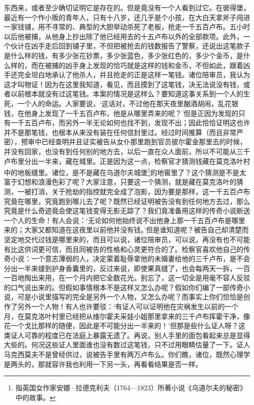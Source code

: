 东西来，或者至少确切证明它是存在的。但是竟没有一个人看到过它。在彼得堡，最近有一个作小贩的青年人，只有十八岁，还几乎是个小孩，在大白天拿斧子闯进一家钱铺，用不寻常的、典型的大胆举动杀死了老板，抢走一千五百卢布。五小时以后他被捕，从他身上抄出除了他已经用去的十五卢布以外的全部款项。此外，一个伙计在凶手走后回到铺子里，不但把被抢去的钱数报告了警察，还说出这笔款子是什么样的钱，有多少张花钞票，多少张蓝色，多少张红色的，多少个金币，是什么样的，而在被捕的凶手身上发现的恰巧就是这样的钱和金币，不但如此，跟着凶手还完全坦白地承认了他杀人，并且抢走的正是这样一笔钱。诸位陪审员，我认为这才叫物证！因为在这里我知道，看见，而且摸到了这笔钱，决无法说没有钱，或者以前根本就没有过这笔钱。本案的情况是这样么？要知道这事关系到一个人的生死，一个人的命运。人家要说，‘这话对，不过他在那天夜里酗酒胡闹，乱花银钱，在他身上发现了一千五百卢布，他是从哪里弄来的呢？’但是正因为发现的只有一千五百卢布，而另外一半无论如何也找不到，发现不出；因此恰恰证明这也许并不是那笔钱，也根本从来没有装在任何信封里过。经过时间推算（而且非常严密），预审中已经查明并且证实被告从女仆那里跑到官员彼尔霍金那里去的时候，并没有回家，也没有到任何别的地方去，以后一直在众人面前，所以不可能从三千卢布里分出一半来，藏在城里。正是因为这一点，检察官才猜测钱藏在莫克洛叶村中的地板缝里。诸位，是不是藏在乌道尔夫城堡\footnote{指英国女作家安娜·拉德克利夫（1764—1823）所著小说《乌道尔夫的秘密》中的故事。}的地窖里了？这个猜测是不是太富于幻想和浪漫色彩了呢？大家注意，只要这一个猜测，就是藏在莫克洛叶的猜测，一被打消，关于抢劫的指控就完全成了泡影，因为要是那样，这一千五百卢布究竟在哪里，究竟跑到哪儿去了呢？既然已经证明被告没有到任何地方去过，那么究竟是什么奇迹竟会使这笔钱变得无影无踪了？我们竟准备用这样的传奇小说断送一个人的生命！有人会说：‘无论如何他始终说不出他身上那一千五百卢布是哪里来的；大家又都知道在这夜里以前他并没有钱。’但是谁知道呢？被告自己却清楚而坚定地交代过钱是哪里来的，而且可以说，诸位陪审员，可以说，再没有也不可能有比这供词更可信，而且同被告的性格和心灵更符合的了。检察官喜欢他自己的传奇小说：一个意志薄弱的人，决定蒙着耻辱拿他的未婚妻给他的三千卢布，是不会分出一半来缝到护身香囊里的，反过来说，即使果真缝了，也会每两天一拆，一百一百地掏出来用，在一个月内把它全数花光。别忘了，这一切全是用毫不容人反驳的口气说出来的。但假如事情根本不是这样又怎么办呢？假如你们编了一部传奇小说，可是小说里描写的完全是另外一个人物，又怎么办呢？而事实上你们恰恰是创作了另外一个人物！有人也许要驳：‘有证人可以证明他在灾祸发生以前的一个月，在莫克洛叶村里已经把从维尔霍夫采娃小姐那里拿来的三千卢布挥霍干净，像花一个戈比那样的随便，因此是不可能分出一半来的！’但那是些什么证人呀？这类证人可靠的程度已在法庭上暴露无遗了。再说，别人手里的面包看起来总是显得大些的。何况这些证人里面谁也没有数过这笔钱，只不过用眼睛估量了一下。证人马克西莫夫不是曾经供过，说被告手里有两万卢布么。你们瞧，诸位，既然心理学是两头的，那就容许我也利用一下另一头，再看看结果是否一样。
